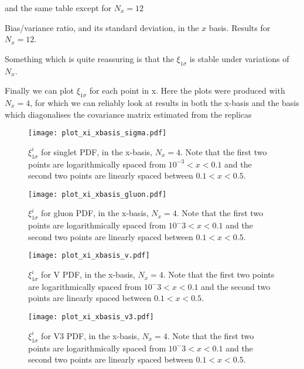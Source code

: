 \FloatBarrier

and the same table except for $N_x=12$

\begin{table}[h!]
    \label{tab:xbasis_xi_nx12}
    
    \caption{Bias/variance ratio, and its standard deviation, in the $x$ basis. Results for $N_x=12$. }
\end{table}

\FloatBarrier

Something which is quite reassuring is that the $\xi_{1\sigma}$ is stable under
variations of $N_x$.

Finally we can plot $\xi_{1\sigma}$ for each point in x. Here the plots were
produced with $N_x=4$, for which we can reliably look at results in both the
x-basis and the basis which diagonalises the covariance matrix estimated
from the replicas

\begin{figure}
    \centering
    \texttt{[image: plot\_xi\_xbasis\_sigma.pdf]}
    \caption{
        $\xi^{i}_{1\sigma}$ for singlet PDF, in the x-basis, $N_x=4$. Note that
        the first two points are logarithmically spaced from $10^{-3} < x < 0.1$
        and the second two points are linearly spaced between $0.1 < x < 0.5$.}
    \label{fig:pdfxisinglet}
\end{figure}

\begin{figure}
    \centering
    \texttt{[image: plot\_xi\_xbasis\_gluon.pdf]}
    \caption{
        $\xi^{i}_{1\sigma}$ for gluon PDF, in the x-basis, $N_x=4$. Note that
        the first two points are logarithmically spaced from $10^-3 < x < 0.1$
        and the second two points are linearly spaced between $0.1 < x < 0.5$.
    }
    \label{fig:pdfxigluon}
\end{figure}

\begin{figure}
    \centering
    \texttt{[image: plot\_xi\_xbasis\_v.pdf]}
    \caption{
        $\xi^{i}_{1\sigma}$ for V PDF, in the x-basis, $N_x=4$. Note that
        the first two points are logarithmically spaced from $10^-3 < x < 0.1$
        and the second two points are linearly spaced between $0.1 < x < 0.5$.
    }
    \label{fig:pdfxiv}
\end{figure}

\begin{figure}
    \centering
    \texttt{[image: plot\_xi\_xbasis\_v3.pdf]}
    \caption{
        $\xi^{i}_{1\sigma}$ for V3 PDF, in the x-basis, $N_x=4$. Note that
        the first two points are logarithmically spaced from $10^-3 < x < 0.1$
        and the second two points are linearly spaced between $0.1 < x < 0.5$.
    }
    \label{fig:pdfxiv3}
\end{figure}

